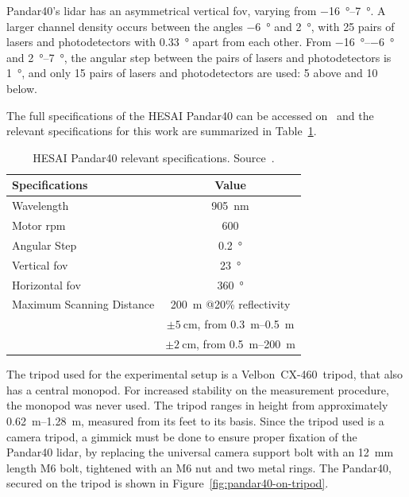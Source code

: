 Pandar40's \ac{lidar} has an asymmetrical vertical \ac{fov}, varying from \SIrange{-16}{+7}{\degree}. A larger channel density occurs between the angles \SI{-6}{\degree} and \SI{+2}{\degree}, with 25 pairs of lasers and photodetectors with \SI{0.33}{\degree} apart from each other. From \SIrange{-16}{-6}{\degree} and \SIrange{+2}{+7}{\degree}, the angular step between the pairs of lasers and photodetectors is \SI{1}{\degree}, and only 15 pairs of lasers and photodetectors are used: 5 above and 10 below.

The full specifications of the HESAI Pandar40 can be accessed on~\cite{Pandar40UserGuide} and the relevant specifications for this work are summarized in Table~\ref{tab:pandar40-specs}.

\begin{table}[!ht]
\centering
\renewcommand{\arraystretch}{1.2}
\begin{tabular}{@{}p{6cm}c@{}}
	\toprule
	Specifications & Value \\
	\midrule
	Wavelength & \SI{905}{\nano\meter} \\
	Motor \ac{rpm} & 600 \\
	Angular Step & \SI{0.2}{\degree} \\
	Vertical \ac{fov} & \SI{23}{\degree} \\
	Horizontal \ac{fov} & \SI{360}{\degree} \\
	Maximum Scanning Distance & \SI{200}{\meter} @20\% reflectivity \\
																				 & $\pm \SI{5}{\centi\meter}$, from \SIrange{0.3}{0.5}{\meter} \\
	\rowcolor{white} \multirow{-2}{*}{Measurement Accuracy} & $\pm \SI{2}{\centi\meter}$, from \SIrange{0.5}{200}{\meter} \\
	\bottomrule
\end{tabular}
\caption[HESAI Pandar40 relevant specifications.]{HESAI Pandar40 relevant specifications. Source~\cite{Pandar40UserGuide}.}
\label{tab:pandar40-specs}
\end{table}

The tripod used for the experimental setup is a Velbon\cp~CX-460\texttrademark~tripod, that also has a central monopod. For increased stability on the measurement procedure, the monopod was never used. The tripod ranges in height from approximately \SIrange{0.62}{1.28}{\meter}, measured from its feet to its basis. Since the tripod used is a camera tripod, a gimmick must be done to ensure proper fixation of the Pandar40 \ac{lidar}, by replacing the universal camera support bolt with an \SI{12}{\milli\meter} length M6 bolt, tightened with an M6 nut and two metal rings. The Pandar40, secured on the tripod is shown in Figure~\ref{fig:pandar40-on-tripod}.


